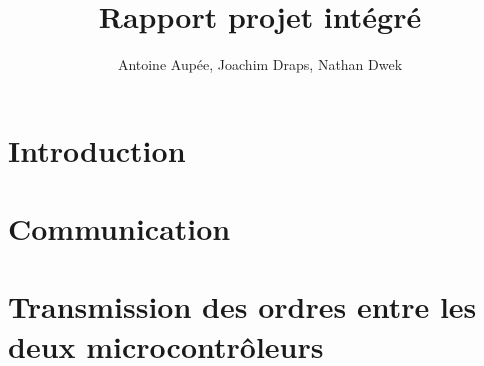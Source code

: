 \documentclass[a4paper, 11pt, frenchb]{report}
\title{Rapport projet intégré}
\author{Antoine Aupée, Joachim Draps, Nathan Dwek}
\begin{document}

\setcounter{page}{2}
\tableofcontents

\chapter{Introduction}


\chapter{Communication}


\chapter{Transmission des ordres entre les deux microcontrôleurs}

\end{document}
